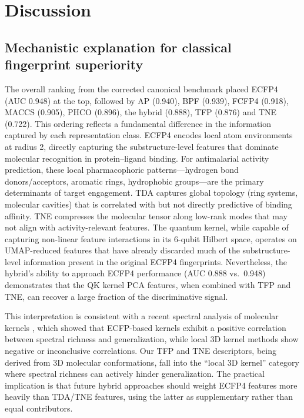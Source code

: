 \documentclass[11pt,a4paper]{article}
\begin{document}
\section{Discussion}



\subsection{Mechanistic explanation for classical fingerprint superiority}


The overall ranking from the corrected canonical benchmark placed ECFP4 (AUC 0.948) at the top, followed by AP (0.940), BPF (0.939), FCFP4 (0.918), MACCS (0.905), PHCO (0.896), the hybrid (0.888), TFP (0.876) and TNE (0.722). This ordering reflects a fundamental difference in the information captured by each representation class. ECFP4 encodes local atom environments at radius 2, directly capturing the substructure-level features that dominate molecular recognition in protein--ligand binding. For antimalarial activity prediction, these local pharmacophoric patterns---hydrogen bond donors/acceptors, aromatic rings, hydrophobic groups---are the primary determinants of target engagement. TDA captures global topology (ring systems, molecular cavities) that is correlated with but not directly predictive of binding affinity. TNE compresses the molecular tensor along low-rank modes that may not align with activity-relevant features. The quantum kernel, while capable of capturing non-linear feature interactions in its 6-qubit Hilbert space, operates on UMAP-reduced features that have already discarded much of the substructure-level information present in the original ECFP4 fingerprints. Nevertheless, the hybrid's ability to approach ECFP4 performance (AUC 0.888 vs.\ 0.948) demonstrates that the QK kernel PCA features, when combined with TFP and TNE, can recover a large fraction of the discriminative signal.

This interpretation is consistent with a recent spectral analysis of molecular kernels \citep{jamali2025spectral}, which showed that ECFP-based kernels exhibit a positive correlation between spectral richness and generalization, while local 3D kernel methods show negative or inconclusive correlations. Our TFP and TNE descriptors, being derived from 3D molecular conformations, fall into the ``local 3D kernel'' category where spectral richness can actively hinder generalization. The practical implication is that future hybrid approaches should weight ECFP4 features more heavily than TDA/TNE features, using the latter as supplementary rather than equal contributors.
\end{document}
